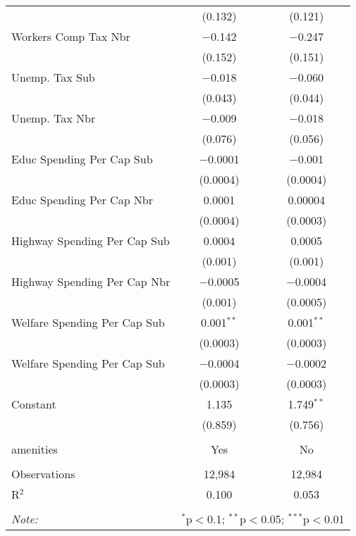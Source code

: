\begin{table}[!htbp]
\begin{tabular}{@{\extracolsep{5pt}}lcc}
  & (0.132) & (0.121) \\ 
  Workers Comp Tax Nbr & $-$0.142 & $-$0.247 \\ 
  & (0.152) & (0.151) \\ 
  Unemp. Tax Sub & $-$0.018 & $-$0.060 \\ 
  & (0.043) & (0.044) \\ 
  Unemp. Tax Nbr & $-$0.009 & $-$0.018 \\ 
  & (0.076) & (0.056) \\ 
  Educ Spending Per Cap Sub & $-$0.0001 & $-$0.001 \\ 
  & (0.0004) & (0.0004) \\ 
  Educ Spending Per Cap Nbr & 0.0001 & 0.00004 \\ 
  & (0.0004) & (0.0003) \\ 
  Highway Spending Per Cap Sub & 0.0004 & 0.0005 \\ 
  & (0.001) & (0.001) \\ 
  Highway Spending Per Cap Nbr & $-$0.0005 & $-$0.0004 \\ 
  & (0.001) & (0.0005) \\ 
  Welfare Spending Per Cap Sub & 0.001$^{**}$ & 0.001$^{**}$ \\ 
  & (0.0003) & (0.0003) \\ 
  Welfare Spending Per Cap Sub & $-$0.0004 & $-$0.0002 \\ 
  & (0.0003) & (0.0003) \\ 
  Constant & 1.135 & 1.749$^{**}$ \\ 
  & (0.859) & (0.756) \\ 
 \hline \\[-1.8ex] 
amenities & Yes & No \\ 
\hline \\[-1.8ex] 
Observations & 12,984 & 12,984 \\ 
R$^{2}$ & 0.100 & 0.053 \\ 
\hline 
\hline \\[-1.8ex] 
\textit{Note:}  & \multicolumn{2}{r}{$^{*}$p$<$0.1; $^{**}$p$<$0.05; $^{***}$p$<$0.01} \\ 
\end{tabular} 
\end{table} 

